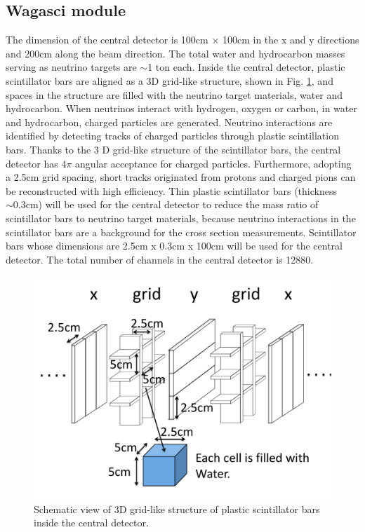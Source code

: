 \subsection{Wagasci module}
The dimension of the central detector is 100cm $\times$ 100cm in the x and y directions
and 200cm along the beam direction.
The total water and hydrocarbon masses serving as neutrino targets are $\sim$1 ton each.
Inside the central detector, plastic scintillator bars are aligned as a 3D grid-like structure, shown in Fig. \ref{fig:3dgrid},
and spaces in the structure are filled with the neutrino target materials, water and hydrocarbon.
When neutrinos interact with hydrogen, oxygen or carbon, in water and hydrocarbon,
charged particles are generated.
Neutrino interactions are identified by detecting tracks of charged particles through plastic scintillation bars.
Thanks to the 3 D grid-like structure of the scintillator bars, 
the central detector has $4\pi$ angular acceptance for charged particles.
Furthermore, adopting a 2.5cm grid spacing, short tracks originated from protons and charged pions can be reconstructed
with high efficiency.
Thin plastic scintillator bars (thickness $\sim 0.3$cm) will be used for the central detector
to reduce  the mass ratio of scintillator bars to neutrino target materials,
because neutrino interactions in the scintillator bars are a background for the cross section measurements.
Scintillator bars whose dimensions are 2.5cm x 0.3cm x 100cm will be used for the central detector.
The total number of channels in the central detector is 12880.

\begin{figure}[tbh]
\begin{center}
\includegraphics[width=0.6\linewidth]{fig/3d_grid_structure.pdf}
\end{center}
\caption{
Schematic view of 3D grid-like structure of plastic scintillator bars inside the central detector.
}
\label{fig:3dgrid}
\end{figure}
